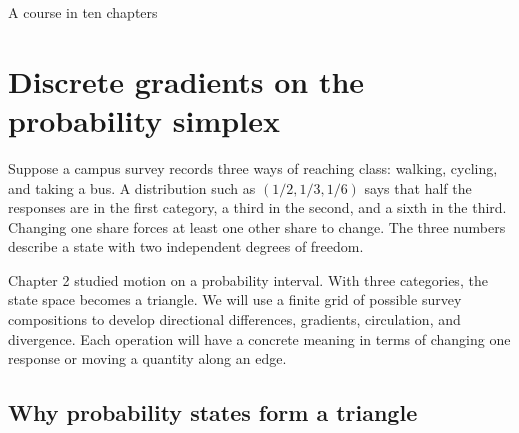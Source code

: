 \documentclass[11pt,oneside,openany]{book}
\theoremstyle{definition}
\theoremstyle{remark}
\numberwithin{equation}{chapter}
\begin{document}
\begin{titlepage}\color{ink}\centering\vspace*{1.0in}{\small\sffamily PROBABILITY AND MATHEMATICAL MODELLING\par}\vspace{.45in}{\Huge\bfseries Discrete Information\\[.12in]Geometry\par}\vspace{.35in}{\Large Finite Differences, Probability,\\and Information Flows\par}\vspace{1cm}{\Large Chapter 3\par}\vfill{}\vfill{\large A course in ten chapters\par}\end{titlepage}
\setcounter{chapter}{2}

\chapter{Discrete gradients on the probability simplex}
Suppose a campus survey records three ways of reaching class: walking, cycling, and taking a bus. A distribution such as \((1/2,1/3,1/6)\) says that half the responses are in the first category, a third in the second, and a sixth in the third. Changing one share forces at least one other share to change. The three numbers describe a state with two independent degrees of freedom.

Chapter 2 studied motion on a probability interval. With three categories, the state space becomes a triangle. We will use a finite grid of possible survey compositions to develop directional differences, gradients, circulation, and divergence. Each operation will have a concrete meaning in terms of changing one response or moving a quantity along an edge.

\section{Why probability states form a triangle}\label{ch03-why-probability-states-form-a-triangle}
\end{document}
